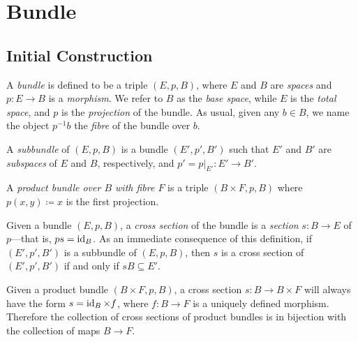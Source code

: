\documentclass[../../../deep-dive]{subfile}
\begin{document}
\section{Bundle}

\subsection{Initial Construction}

\begin{definition}[Bundle]
\label{def:bundle}
A \emph{bundle} is defined to be a triple \((E, p, B)\), where \(E\) and \(B\)
are \emph{spaces} and \(p: E \to B\) is a \emph{morphism}. We refer to \(B\) as
the \emph{base space}, while \(E\) is the \emph{total space}, and \(p\) is the
\emph{projection} of the bundle. As usual, given any \(b \in B\), we name the
object \(p^{-1} b\) the \emph{fibre} of the bundle over \(b\).

A \emph{subbundle} of \((E, p, B)\) is a bundle \((E', p', B')\) such that
\(E'\) and \(B'\) are \emph{subspaces} of \(E\) and \(B\), respectively, and
\(p' = p|_{E'}: E' \to B'\).
\end{definition}

\begin{definition}
\label{def:product-bundle}
A \emph{product bundle over \(B\) with fibre \(F\)} is a triple
\((B \times F, p, B)\) where \(p(x, y) \coloneq x\) is the first projection.
\end{definition}

\begin{definition}
\label{def:cross-section-bundle}
Given a bundle \((E, p, B)\), a \emph{cross section} of the bundle is a
\emph{section} \(s: B \to E\) of \(p\)---that is, \(p s = \operatorname{id}_B\). As
an immediate consequence of this definition, if \((E', p', B')\) is a subbundle
of \((E, p, B)\), then \(s\) is a cross section of \((E', p', B')\) if and only
if \(s B \subseteq E'\).
\end{definition}

\begin{lemma}
\label{lem:cross-section-of-product-bundle}
Given a product bundle \((B \times F, p, B)\), a cross section
\(s: B \to B \times F\) will always have the form \(s = \operatorname{id}_B \times f\), where
\(f: B \to F\) is a uniquely defined morphism. Therefore the collection of cross
sections of product bundles is in bijection with the collection of maps
\(B \to F\).
\end{lemma}
\end{document}
